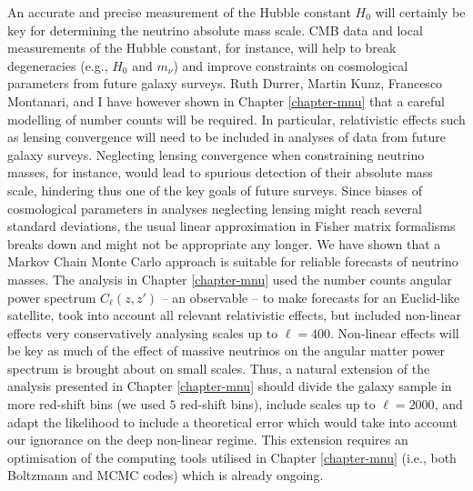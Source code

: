 An accurate and precise measurement of the Hubble constant $H_0$ will certainly be key for determining the neutrino absolute mass scale. CMB data and local measurements of the Hubble constant, for instance, will help to break degeneracies (e.g., $H_0$ and $m_\nu$) and improve constraints on cosmological parameters from future galaxy surveys.  Ruth Durrer, Martin Kunz, Francesco Montanari, and I have however shown in Chapter \ref{chapter-mnu} that a careful modelling of number counts will be required. In particular, relativistic effects such as lensing convergence will need to be included in analyses of data from future galaxy surveys. Neglecting lensing convergence when constraining neutrino masses, for instance, would lead to spurious detection of their absolute mass scale, hindering thus one of the key goals of future surveys. Since biases of cosmological parameters in analyses neglecting lensing might reach several standard deviations, the usual linear approximation in Fisher matrix formalisms breaks down and might not be appropriate any longer. We have shown that a Markov Chain Monte Carlo approach is suitable for reliable forecasts of neutrino masses. The analysis in Chapter \ref{chapter-mnu} used the number counts angular power spectrum $C_\ell(z,z')$ -- an observable -- to make forecasts for an Euclid-like satellite, took into account all relevant relativistic effects, but included non-linear effects very conservatively analysing scales up to $\ell=400$. Non-linear effects will be key as much of the effect of massive neutrinos on the angular matter power spectrum is brought about on small scales. Thus, a natural extension of the analysis presented in Chapter \ref{chapter-mnu} should divide the galaxy sample in more red-shift bins (we used $5$ red-shift bins), include scales up to $\ell=2000$, and adapt the likelihood to include a theoretical error which would take into account our ignorance on the deep non-linear regime. This extension requires an optimisation of the computing tools utilised in Chapter \ref{chapter-mnu} (i.e., both Boltzmann and MCMC codes) which is already ongoing.   

